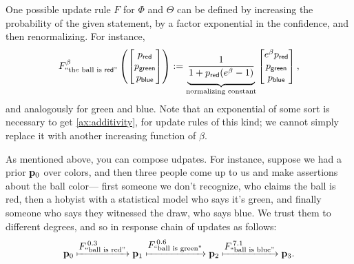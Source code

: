 \documentclass{article}
\begin{document}
\begin{examplex}
One possible update rule $F$ for $\Phi$ and $\Theta$ can be defined by increasing the probability of the given statement, by a factor exponential in the confidence, and then renormalizing.
For instance,
    \[
        F^{\beta}_{\text{``the ball is ${\mathsf{red}}$''}} \left(
            \begin{bmatrix} p_{\mathsf{red}} \\ p_{\mathsf{green}} \\ p_{\mathsf{blue}} \\ \end{bmatrix}
        \right) :=
            \underbrace{\vphantom{\Bigg|}
                \frac{1}{1 + p_{\mathsf{red}} (e^{\beta} - 1) }
            }_{\text{normalizing constant}}
            \begin{bmatrix}
                e^\beta  p_{\mathsf{red}} \\
                p_{\mathsf{green}}  \\
                p_{\mathsf{blue}}
            \end{bmatrix},
    \]
    and analogously for green and blue.
    Note that an exponential of some sort is necessary to get \cref{ax:additivity}, for update rules of this kind; we cannot simply replace it with another increasing function of $\beta$.

    As mentioned above, you can compose udpates. For instance, suppose we had a prior $\mathbf{p}_0$ over colors, and then three people come up to us and make assertions about the ball color---%
    first someone we don't recognize, who claims the ball is red, then a hobyist with a statistical model who says it's green, and finally someone who says they witnessed the draw, who says blue.
    We trust them to different degrees, and so in response  chain of updates as follows:
    \[
        \mathbf{p}_0
            \xmapsto{\displaystyle F^{\,0.3}_{\text{``ball is red''}}}
        \mathbf{p}_1
            \xmapsto{\displaystyle F^{\,0.6}_{\text{``ball is green''}}}
        \mathbf{p}_2
            \xmapsto{\displaystyle F^{\,7.1}_{\text{``ball is blue''}}}
        \mathbf{p}_3.
    \]


\end{examplex}
\end{document}
